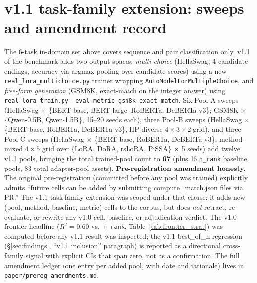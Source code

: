 \documentclass[11pt]{article}
\begin{document}
\section{v1.1 task-family extension: sweeps and amendment record}\label{app:v11}
The 6-task in-domain set above covers sequence and pair classification only. v1.1 of the benchmark adds two output spaces: \emph{multi-choice} (HellaSwag, 4 candidate endings, accuracy via argmax pooling over candidate scores) using a new \texttt{real\_\allowbreak lora\_\allowbreak multichoice.\allowbreak py} trainer wrapping \texttt{AutoModelForMultipleChoice}, and \emph{free-form generation} (GSM8K, exact-match on the integer answer) using \texttt{real\_\allowbreak lora\_\allowbreak train.\allowbreak py --eval-metric gsm8k\_\allowbreak exact\_\allowbreak match}. Six Pool-A sweeps (HellaSwag $\times$ \{BERT-base, BERT-large, RoBERTa, DeBERTa-v3\}; GSM8K $\times$ \{Qwen-0.5B, Qwen-1.5B\}, 15--20 seeds each), three Pool-B sweeps (HellaSwag $\times$ \{BERT-base, RoBERTa, DeBERTa-v3\}, HP-diverse $4{\times}3{\times}2$ grid), and three Pool-C sweeps (HellaSwag $\times$ \{BERT-base, RoBERTa, DeBERTa-v3\}, method-mixed $4{\times}5$ grid over $\{$LoRA, DoRA, rsLoRA, PiSSA$\}$ $\times$ 5 seeds) add twelve v1.1 pools, bringing the total trained-pool count to \textbf{67} (plus 16 \texttt{n\_rank} baseline pools, $83$ total adapter-pool assets). \textbf{Pre-registration amendment honesty.} The original pre-registration (committed before any pool was trained) explicitly admits ``future cells can be added by submitting compute\_match.json files via PR.'' The v1.1 task-family extension was scoped under that clause: it adds new (pool, method, baseline, metric) cells to the corpus, but does \emph{not} retract, re-evaluate, or rewrite any v1.0 cell, baseline, or adjudication verdict. The v1.0 frontier headline ($R^2{=}0.60$ vs.\ \texttt{n\_rank}, Table~\ref{tab:frontier_strat}) was computed before any v1.1 result was inspected; the v1.1 best\_of\_n regression (\S\ref{sec:findings}, ``v1.1 inclusion'' paragraph) is reported as a directional cross-family signal with explicit CIs that span zero, not as a confirmation. The full amendment ledger (one entry per added pool, with date and rationale) lives in \texttt{paper/\allowbreak prereg\_\allowbreak amendments.\allowbreak md}.
\end{document}
